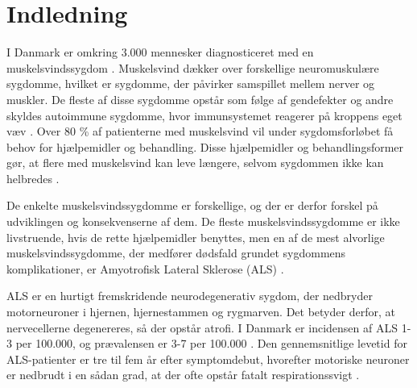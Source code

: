\section{Indledning}



I Danmark er omkring 3.000 mennesker diagnosticeret med en muskelsvindssygdom \citep{universitet2013}. Muskelsvind dækker over forskellige neuromuskulære sygdomme, hvilket er sygdomme, der påvirker samspillet mellem nerver og muskler. De fleste af disse sygdomme opstår som følge af gendefekter og andre skyldes autoimmune sygdomme, hvor immunsystemet reagerer på kroppens eget væv \citep{arathata2014}. Over 80 \% af patienterne med muskelsvind vil under sygdomsforløbet få behov for hjælpemidler og behandling. Disse hjælpemidler og behandlingsformer gør, at flere med muskelsvind kan leve længere, selvom sygdommen ikke kan helbredes \citep{hvadermuskelsvind2016}. 

De enkelte muskelsvindssygdomme er forskellige, og der er derfor forskel på udviklingen og konsekvenserne af dem. De fleste muskelsvindssygdomme er ikke livstruende, hvis de rette hjælpemidler benyttes, men en af de mest alvorlige muskelsvindssygdomme, der medfører dødsfald grundet sygdommens komplikationer, er Amyotrofisk Lateral Sklerose (ALS) \citep{henschke2012}. 

ALS er en hurtigt fremskridende neurodegenerativ sygdom, der nedbryder motorneuroner i hjernen, hjernestammen og rygmarven. Det betyder derfor, at nervecellerne degenereres, så der opstår atrofi. I Danmark er incidensen af ALS 1-3 per 100.000, og prævalensen er 3-7 per 100.000 \citep{russell2015}. Den gennemsnitlige levetid for ALS-patienter er tre til fem år efter symptomdebut, hvorefter motoriske neuroner er nedbrudt i en sådan grad, at der ofte opstår fatalt respirationssvigt \citep{grehl2011, morris2015}.

